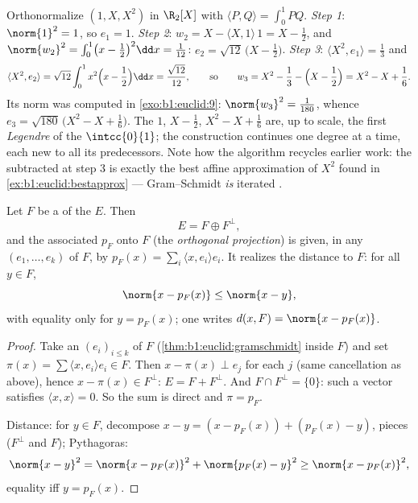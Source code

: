 \begin{example}
\label{ex:b1:euclid:legendre}
Orthonormalize $(1, X, X^2)$ in $\R_2[X]$ with $\langle P,
Q\rangle = \int_0^1 PQ$. \emph{Step 1}: $\norm{1}^2 = 1$, so
$e_1 = 1$. \emph{Step 2}: $w_2 = X - \langle X, 1\rangle\,1 = X -
\frac12$, and $\norm{w_2}^2 = \int_0^1\bigl(x - \frac12\bigr)^2
\dd x = \frac1{12}$: $e_2 = \sqrt{12}\,\bigl(X - \frac12\bigr)$.
\emph{Step 3}: $\langle X^2, e_1\rangle = \frac13$ and
\[
\langle X^2, e_2\rangle
= \sqrt{12}\int_0^1 x^2\Bigl(x - \frac12\Bigr)\dd x
= \frac{\sqrt{12}}{12},
\qquad\text{so}\qquad
w_3 = X^2 - \frac13 - \Bigl(X - \frac12\Bigr)
= X^2 - X + \frac16 .
\]
Its norm was computed in \cref{exo:b1:euclid:9}: $\norm{w_3}^2 =
\frac1{180}$, whence $e_3 = \sqrt{180}\,\bigl(X^2 - X +
\frac16\bigr)$. The  $1$, $X - \frac12$, $X^2 - X +
\frac16$ are, up to scale, the first \emph{Legendre }
of the  $\intcc{0}{1}$; the construction continues one
degree at a time, each new   to all its
predecessors. Note how the algorithm recycles earlier work: the
 subtracted at step 3 is exactly the best affine
approximation of $X^2$ found in \cref{ex:b1:euclid:bestapprox}
--- Gram--Schmidt \emph{is} iterated .
\end{example}

\begin{theorem}\label{thm:b1:euclid:projection}
Let $F$ be a  of the  $E$. Then
\[
E = F \oplus F^{\perp},
\]
and the associated  $p_F$ onto $F$ (the \emph{orthogonal
projection}) is given, in any
  $(e_1, \dots, e_k)$ of $F$, by $p_F(x) = \sum_i
\langle x, e_i\rangle e_i$. It realizes the distance to $F$:
for all $y \in F$,
\[
\norm{x - p_F(x)} \leq \norm{x - y},
\]
with equality only for $y = p_F(x)$; one writes $d(x, F) = \norm{x -
p_F(x)}$.
\end{theorem}

\begin{proof}
Take an   $(e_i)_{i \leq k}$ of $F$
(\cref{thm:b1:euclid:gramschmidt} inside $F$) and set $\pi(x) =
\sum \langle x, e_i\rangle e_i \in F$. Then $x - \pi(x) \perp e_j$
for each $j$ (same cancellation as above), hence $x - \pi(x) \in
F^\perp$: $E = F + F^\perp$. And $F \cap F^\perp = \{0\}$: such a
vector satisfies $\langle x, x\rangle = 0$. So the sum is direct and
$\pi = p_F$.

Distance: for $y \in F$, decompose $x - y = (x - p_F(x)) + (p_F(x) -
y)$,  pieces ($F^\perp$ and $F$); Pythagoras:
\[
\norm{x - y}^2 = \norm{x - p_F(x)}^2 + \norm{p_F(x) - y}^2
\geq \norm{x - p_F(x)}^2,
\]
equality iff $y = p_F(x)$.
\end{proof}

